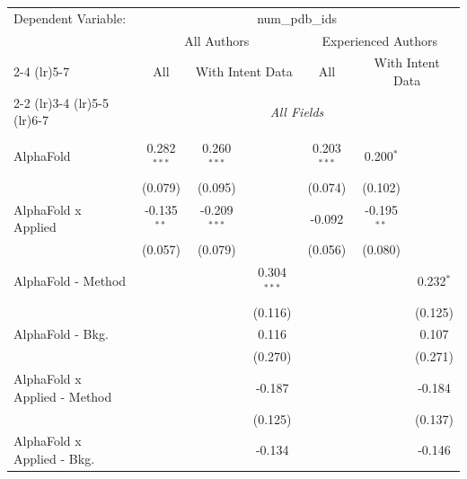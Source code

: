 \begingroup
\centering
\begin{tabular}{lcccccc}
   \tabularnewline \midrule \midrule
   Dependent Variable: & \multicolumn{6}{c}{num\_pdb\_ids}\\
 & \multicolumn{3}{c}{All Authors} & \multicolumn{3}{c}{Experienced Authors} \\
\cmidrule(lr){2-4} \cmidrule(lr){5-7}
 & \multicolumn{1}{c}{All} & \multicolumn{2}{c}{With Intent Data} & \multicolumn{1}{c}{All} & \multicolumn{2}{c}{With Intent Data} \\
\cmidrule(lr){2-2} \cmidrule(lr){3-4} \cmidrule(lr){5-5} \cmidrule(lr){6-7}
 & \multicolumn{6}{c}{\textit{All Fields}} \\ \\
   AlphaFold                      & 0.282$^{***}$ & 0.260$^{***}$  &               & 0.203$^{***}$ & 0.200$^{*}$   &   \\   
                                  & (0.079)       & (0.095)        &               & (0.074)       & (0.102)       &   \\   
   AlphaFold x Applied            & -0.135$^{**}$ & -0.209$^{***}$ &               & -0.092        & -0.195$^{**}$ &   \\   
                                  & (0.057)       & (0.079)        &               & (0.056)       & (0.080)       &   \\   
   AlphaFold - Method             &               &                & 0.304$^{***}$ &               &               & 0.232$^{*}$\\   
                                  &               &                & (0.116)       &               &               & (0.125)\\   
   AlphaFold - Bkg.               &               &                & 0.116         &               &               & 0.107\\   
                                  &               &                & (0.270)       &               &               & (0.271)\\   
   AlphaFold x Applied - Method   &               &                & -0.187        &               &               & -0.184\\   
                                  &               &                & (0.125)       &               &               & (0.137)\\   
   AlphaFold x Applied - Bkg.     &               &                & -0.134        &               &               & -0.146\\   

\end{tabular}
